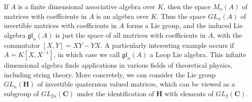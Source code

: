 \begin{example}
    If $A$ is a finite dimensional associative algebra over $K$, then the space $M_n(A)$ of matrices with coefficients in $A$ is an algebra over $K$. Thus the space $GL_n(A)$ of invertible matrices with coefficients in $A$ forms a Lie group, and the induced Lie algebra $\mathfrak{gl}_n(A)$ is just the space of all matrices with coefficients in $A$, with the commutator $[X,Y] = XY - YX$. A particularly interesting example occurs if $A = K[X,X^{-1}]$, in which case we call $\mathfrak{gl}_n(A)$ a Loop Lie algebra. This infinite dimensional algebra finds applications in various fields of theoretical physics, including string theory. More concretely, we can consider the Lie group $GL_n(\mathbf{H})$ of invertible quaternion valued matrices, which can be viewed as a subgroup of $GL_{2n}(\mathbf{C})$ under the identification of $\mathbf{H}$ with elements of $GL_2(\mathbf{C})$.
\end{example}

